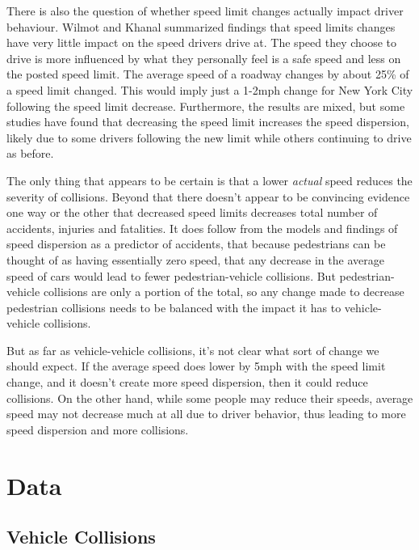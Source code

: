 \documentclass[10pt,journal,compsoc]{IEEEtran}
\begin{document}
There is also the question of whether speed limit changes actually impact driver behaviour.  Wilmot and Khanal summarized findings that speed limits changes have very little impact on the speed drivers drive at.  The speed they choose to drive is more influenced by what they personally feel is a safe speed and less on the posted speed limit.  The average speed of a roadway changes by about 25\% of a speed limit changed.  This would imply just a 1-2mph change for New York City following the speed limit decrease.  Furthermore, the results are mixed, but some studies have found that decreasing the speed limit increases the speed dispersion, likely due to some drivers following the new limit while others continuing to drive as before\cite{wilmot1999effect}.

The only thing that appears to be certain is that a lower \textit{actual} speed reduces the severity of collisions.  Beyond that there doesn't appear to be convincing evidence one way or the other that decreased speed limits decreases total number of accidents, injuries and fatalities.  It does follow from the models and findings of speed dispersion as a predictor of accidents, that because pedestrians can be thought of  as having essentially zero speed, that any decrease in the average speed of cars would lead to fewer pedestrian-vehicle collisions.  But pedestrian-vehicle collisions are only a portion of the total, so any change made to decrease pedestrian collisions needs to be balanced with the impact it has to vehicle-vehicle collisions.

But as far as vehicle-vehicle collisions, it's not clear what sort of change we should expect.  If the average speed does lower by 5mph with the speed limit change, and it doesn't create more speed dispersion, then it could reduce collisions.  On the other hand, while some people may reduce their speeds, average speed may not decrease much at all due to driver behavior, thus leading to more speed dispersion and more collisions.  




\section{Data}

\subsection{Vehicle Collisions}
\end{document}
